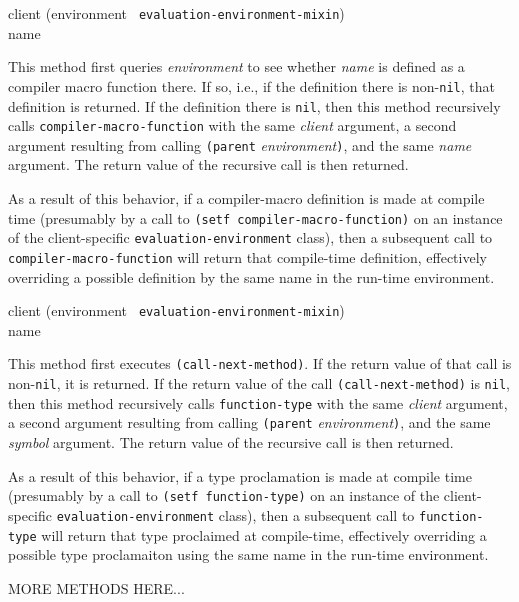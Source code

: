 {\small{} {client (environment {\tt
      evaluation-environment-mixin}) \\ name}
}

This method first queries \textit{environment} to see whether
\textit{name} is defined as a compiler macro function there.  If so,
i.e., if the definition there is non-\texttt{nil}, that definition is
returned.  If the definition there is \texttt{nil}, then this method
recursively calls \texttt{compiler-macro-function} with the same
\textit{client} argument, a second argument resulting from calling
\texttt{(parent} \textit{environment}\texttt{)}, and the same
\textit{name} argument.  The return value of the recursive call is
then returned.

As a result of this behavior, if a compiler-macro definition is made
at compile time (presumably by a call to \texttt{(setf
  compiler-macro-function)} on an instance of the client-specific
\texttt{evaluation-environment} class), then a subsequent call to
\texttt{compiler-macro-function} will return that compile-time
definition, effectively overriding a possible definition by the same
name in the run-time environment.

{\small{} {client (environment {\tt
      evaluation-environment-mixin}) \\ name}
}

This method first executes \texttt{(call-next-method)}.  If the return
value of that call is non-\texttt{nil}, it is returned.  If the return
value of the call \texttt{(call-next-method)} is \texttt{nil}, then
this method recursively calls \texttt{function-type} with the same
\textit{client} argument, a second argument resulting from calling
\texttt{(parent} \textit{environment}\texttt{)}, and the same
\textit{symbol} argument.  The return value of the recursive
call is then returned.

As a result of this behavior, if a type proclamation is made at
compile time (presumably by a call to \texttt{(setf function-type)} on
an instance of the client-specific \texttt{evaluation-environment}
class), then a subsequent call to \texttt{function-type} will return
that type proclaimed at compile-time, effectively overriding a
possible type proclamaiton using the same name in the run-time
environment.

MORE METHODS HERE...
